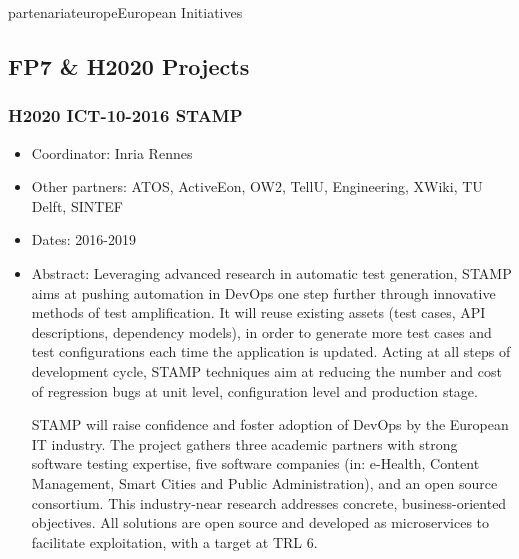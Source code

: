 \documentclass{ra2018}
\begin{document}
\begin{module}{partenariat}{europe}{European Initiatives}

\subsection{FP7 \& H2020 Projects}

\subsubsection*{\label{project:stamp} H2020 ICT-10-2016 STAMP}
\begin{itemize}
	\item Coordinator: Inria Rennes
	\item Other partners: ATOS, ActiveEon, OW2, TellU, Engineering, XWiki, TU Delft, SINTEF
	\item Dates: 2016-2019
	\item Abstract: Leveraging advanced research in automatic test generation, STAMP aims at pushing automation in DevOps one step further through innovative methods of test amplification. It will reuse existing assets (test cases, API descriptions, dependency models), in order to generate more test cases and test configurations each time the application is updated. Acting at all steps of development cycle, STAMP techniques aim at reducing the number and cost of regression bugs at unit level, configuration level and production stage.
	
	STAMP will raise confidence and foster adoption of DevOps by the European IT industry. The project gathers three academic partners with strong software testing expertise, five software companies (in: e-Health, Content Management, Smart Cities and Public Administration), and an open source consortium. This industry-near research addresses concrete, business-oriented objectives. All solutions are open source and developed as microservices to facilitate exploitation, with a target at TRL 6.  
\end{itemize}
%





\end{module}
\end{document}
